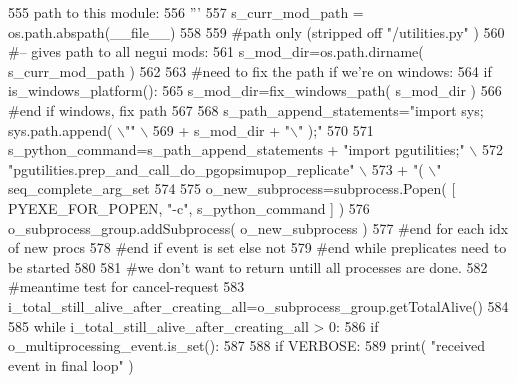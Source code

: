 \begin{DoxyCode}
555 \textcolor{stringliteral}{                    path to this module:}
556 \textcolor{stringliteral}{                    '''}
557                     s\_curr\_mod\_path = os.path.abspath(\_\_file\_\_)
558 
559                     \textcolor{comment}{#path only (stripped off "/utilities.py" )}
560                     \textcolor{comment}{#-- gives path to all negui mods:}
561                     s\_mod\_dir=os.path.dirname( s\_curr\_mod\_path )
562 
563                     \textcolor{comment}{#need to fix the path if we're on windows:}
564                     \textcolor{keywordflow}{if} is\_windows\_platform():
565                         s\_mod\_dir=fix\_windows\_path( s\_mod\_dir )
566                     \textcolor{comment}{#end if windows, fix path}
567                     
568                     s\_path\_append\_statements=\textcolor{stringliteral}{"import sys; sys.path.append( \(\backslash\)""} \(\backslash\)
569                             + s\_mod\_dir + \textcolor{stringliteral}{"\(\backslash\)" );"}
570 
571                     s\_python\_command=s\_path\_append\_statements + \textcolor{stringliteral}{"import pgutilities;"} \(\backslash\)
572                                         \textcolor{stringliteral}{"pgutilities.prep\_and\_call\_do\_pgopsimupop\_replicate"} \(\backslash\)
573                                         + \textcolor{stringliteral}{"( \(\backslash\)"%
      seq\_complete\_arg\_set
574 
575                     o\_new\_subprocess=subprocess.Popen( [ PYEXE\_FOR\_POPEN, \textcolor{stringliteral}{"-c"}, s\_python\_command ] )
576                     o\_subprocess\_group.addSubprocess( o\_new\_subprocess ) 
577                 \textcolor{comment}{#end for each idx of new procs}
578             \textcolor{comment}{#end if event is set else not}
579         \textcolor{comment}{#end while preplicates need to be started}
580 
581         \textcolor{comment}{#we don't want to return untill all processes are done.}
582         \textcolor{comment}{#meantime test for cancel-request}
583         i\_total\_still\_alive\_after\_creating\_all=o\_subprocess\_group.getTotalAlive()
584 
585         \textcolor{keywordflow}{while} i\_total\_still\_alive\_after\_creating\_all > 0:
586             \textcolor{keywordflow}{if} o\_multiprocessing\_event.is\_set():
587 
588                 \textcolor{keywordflow}{if} VERBOSE:
589                     print( \textcolor{stringliteral}{"received event in final loop"} )
}
\end{DoxyCode}
